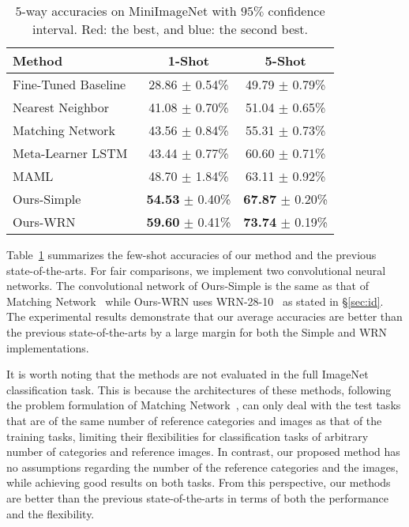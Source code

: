 \begin{table}
    \small
    \centering
    \vspace{0.05in}
    \setlength{\tabcolsep}{0.5em}
    \begin{tabular}{lcc}
        \toprule
        Method & 1-Shot & 5-Shot \\
        \midrule
        Fine-Tuned Baseline & 28.86 $\pm$ 0.54\% & 49.79 $\pm$ 0.79\% \\
        Nearest Neighbor & 41.08 $\pm$ 0.70\% & 51.04 $\pm$ 0.65\% \\
        Matching Network~\cite{DBLP:conf/nips/VinyalsBLKW16} & 43.56 $\pm$ 0.84\% & 55.31 $\pm$ 0.73\% \\
        Meta-Learner LSTM~\cite{ravi2017optimization} & 43.44 $\pm$ 0.77\% & 60.60 $\pm$ 0.71\% \\
        MAML~\cite{pmlr-v70-finn17a} & 48.70 $\pm$ 1.84\% & 63.11 $\pm$ 0.92\% \\
        \hdashline
        Ours-Simple & {\bf\color{blue}54.53} $\pm$ 0.40\% & {\bf\color{blue}67.87} $\pm$ 0.20\% \\
        Ours-WRN & {\bf\color{red}59.60} $\pm$ 0.41\% & {\bf\color{red}73.74} $\pm$ 0.19\% \\
        \bottomrule
    \end{tabular}
    \caption{$5$-way accuracies on MiniImageNet with $95\%$ confidence interval. Red: the best, and blue: the second best.}
    \label{tab:mini}
\end{table}

Table~\ref{tab:mini} summarizes the few-shot accuracies of our method and the previous state-of-the-arts.
For fair comparisons, we implement two convolutional neural networks.
The convolutional network of Ours-Simple is the same as that of Matching Network~\cite{DBLP:conf/nips/VinyalsBLKW16} while Ours-WRN uses WRN-28-10~\cite{Zagoruyko2016WRN} as stated in \S\ref{sec:id}.
The experimental results demonstrate that our average accuracies are better than the previous state-of-the-arts by a large margin for both the Simple and WRN implementations.

It is worth noting that the methods \cite{pmlr-v70-finn17a,ravi2017optimization,DBLP:conf/nips/VinyalsBLKW16} are not evaluated in the full ImageNet classification task.
This is because the architectures of these methods, following the problem formulation of Matching Network~\cite{DBLP:conf/nips/VinyalsBLKW16}, can only deal with the test tasks that are of the same number of reference categories and images as that of the training tasks, limiting their flexibilities for classification tasks of arbitrary number of categories and reference images.
In contrast, our proposed method has no assumptions regarding the number of the reference categories and the images, while achieving good results on both tasks.
From this perspective, our methods are better than the previous state-of-the-arts in terms of both the performance and the flexibility.
